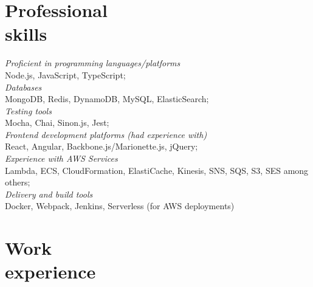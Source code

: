 \documentclass[margin, 10pt]{res} %
\begin{document}
\begin{resume}
\vspace*{-0.5cm}
\section{Professional\\ skills}
{\sl  Proficient in programming languages/platforms}  \\
\-\hspace{0.5cm} Node.js, JavaScript, TypeScript;\\
{\sl Databases }\\
\-\hspace{0.5cm} MongoDB, Redis, DynamoDB, MySQL, ElasticSearch; \\
{\sl Testing tools }\\
\-\hspace{0.5cm} Mocha, Chai, Sinon.js, Jest; \\
{\sl Frontend development platforms (had experience with) }\\
\-\hspace{0.5cm} React, Angular,  Backbone.js/Marionette.js, jQuery;\\
{\sl Experience with AWS Services } \\
\-\hspace{0.5cm}  Lambda, ECS, CloudFormation, ElastiCache, Kinesis, SNS, SQS, S3, SES among others; \\
{\sl Delivery and build tools } \\
\-\hspace{0.5cm} Docker, Webpack, Jenkins, Serverless (for AWS deployments)

\section{Work\\ experience}


\end{resume}
\end{document}
